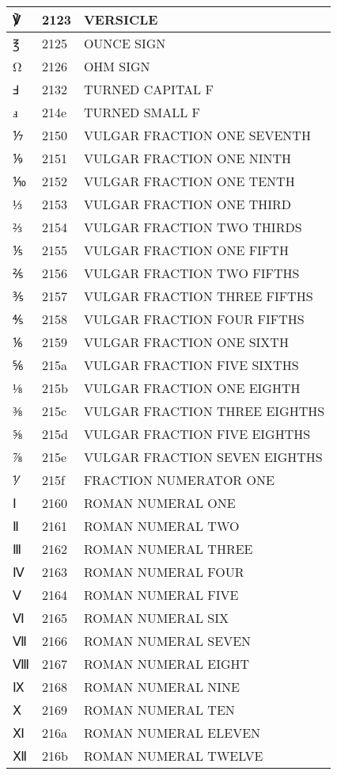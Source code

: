 \documentclass[12pt,letterpaper,openany]{book}
\begin{document}
\begin{center}
\begin{supertabular}{|m{0.25in}|m{0.5in}|m{4in}|}
℣ & 2123 & VERSICLE\\\hline
℥ & 2125 & OUNCE SIGN\\\hline
Ω & 2126 & OHM SIGN\\\hline
Ⅎ & 2132 & TURNED CAPITAL F\\\hline
ⅎ & 214e & TURNED SMALL F\\\hline
⅐ & 2150 & VULGAR FRACTION ONE SEVENTH\\\hline
⅑ & 2151 & VULGAR FRACTION ONE NINTH\\\hline
⅒ & 2152 & VULGAR FRACTION ONE TENTH\\\hline
⅓ & 2153 & VULGAR FRACTION ONE THIRD\\\hline
⅔ & 2154 & VULGAR FRACTION TWO THIRDS\\\hline
⅕ & 2155 & VULGAR FRACTION ONE FIFTH\\\hline
⅖ & 2156 & VULGAR FRACTION TWO FIFTHS\\\hline
⅗ & 2157 & VULGAR FRACTION THREE FIFTHS\\\hline
⅘ & 2158 & VULGAR FRACTION FOUR FIFTHS\\\hline
⅙ & 2159 & VULGAR FRACTION ONE SIXTH\\\hline
⅚ & 215a & VULGAR FRACTION FIVE SIXTHS\\\hline
⅛ & 215b & VULGAR FRACTION ONE EIGHTH\\\hline
⅜ & 215c & VULGAR FRACTION THREE EIGHTHS\\\hline
⅝ & 215d & VULGAR FRACTION FIVE EIGHTHS\\\hline
⅞ & 215e & VULGAR FRACTION SEVEN EIGHTHS\\\hline
⅟ & 215f & FRACTION NUMERATOR ONE\\\hline
Ⅰ & 2160 & ROMAN NUMERAL ONE\\\hline
Ⅱ & 2161 & ROMAN NUMERAL TWO\\\hline
Ⅲ & 2162 & ROMAN NUMERAL THREE\\\hline
Ⅳ & 2163 & ROMAN NUMERAL FOUR\\\hline
Ⅴ & 2164 & ROMAN NUMERAL FIVE\\\hline
Ⅵ & 2165 & ROMAN NUMERAL SIX\\\hline
Ⅶ & 2166 & ROMAN NUMERAL SEVEN\\\hline
Ⅷ & 2167 & ROMAN NUMERAL EIGHT\\\hline
Ⅸ & 2168 & ROMAN NUMERAL NINE\\\hline
Ⅹ & 2169 & ROMAN NUMERAL TEN\\\hline
Ⅺ & 216a & ROMAN NUMERAL ELEVEN\\\hline
Ⅻ & 216b & ROMAN NUMERAL TWELVE\\\hline

\end{supertabular}
\end{center}
\end{document}
